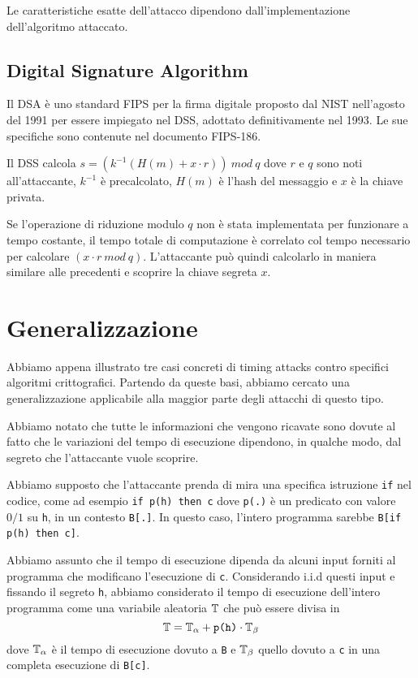 		Le caratteristiche esatte dell'attacco dipendono dall'implementazione dell'algoritmo attaccato.
		
		\subsection{Digital Signature Algorithm}
		Il \ac{DSA} è uno standard \ac{FIPS} per la firma digitale proposto dal \ac{NIST} nell'agosto del 1991 per essere impiegato nel \ac{DSS}, adottato definitivamente nel 1993. Le sue specifiche sono contenute nel documento \ac{FIPS}-186\cite{kravitz1993digital}.
		
		Il \ac{DSS} calcola $s = (k^{-1}(H(m) + x \cdot r)) \ mod \ q$ dove $r$ e $q$ sono noti all'attaccante, $k^{-1}$ è precalcolato, $H(m)$ è l'hash del messaggio e $x$ è la chiave privata.
		
		Se l'operazione di riduzione modulo $q$ non è stata implementata per funzionare a tempo costante, il tempo totale di computazione è correlato col tempo necessario per calcolare $(x \cdot r \ mod \ q)$. L'attaccante può quindi calcolarlo in maniera similare alle precedenti e scoprire la chiave segreta $x$.
		
	\section{Generalizzazione}
	Abbiamo appena illustrato tre casi concreti di timing attacks contro specifici algoritmi crittografici. Partendo da queste basi, abbiamo cercato una generalizzazione applicabile alla maggior parte degli attacchi di questo tipo.
	
	Abbiamo notato che tutte le informazioni che vengono ricavate sono dovute al fatto che le variazioni del tempo di esecuzione dipendono, in qualche modo, dal segreto che l'attaccante vuole scoprire.
	
	Abbiamo supposto che l'attaccante prenda di mira una specifica istruzione \texttt{if} nel codice, come ad esempio \texttt{if p(h) then c} dove \texttt{p(.)} è un predicato con valore $0/1$ su \texttt{h}, in un contesto \texttt{B[.]}. In questo caso, l'intero programma sarebbe \texttt{B[if p(h) then c]}.
	
	Abbiamo assunto che il tempo di esecuzione dipenda da alcuni input forniti al programma che modificano l'esecuzione di \texttt{c}. Considerando i.i.d questi input e fissando il segreto \texttt{h}, abbiamo considerato il tempo di esecuzione dell'intero programma come una variabile aleatoria $\mathbb{T}$ che può essere divisa in $$\mathbb{T} = \mathbb{T}_{\alpha} + \text{\texttt{p(h)}}\cdot \mathbb{T}_{\beta}$$ dove $\mathbb{T}_{\alpha}$ è il tempo di esecuzione dovuto a \texttt{B} e $\mathbb{T}_{\beta}$ quello dovuto a \texttt{c} in una completa esecuzione di \texttt{B[c]}.
	
